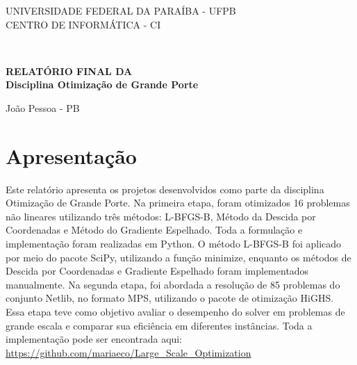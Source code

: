 \documentclass[12pt,a4paper]{article}
\begin{document}
\pagestyle{empty} %

% 
% 

\begin{center}
\Large
UNIVERSIDADE FEDERAL DA PARAÍBA - UFPB \\
CENTRO DE INFORMÁTICA - CI

\end{center}


\vspace{1em}

\begin{center}
\large
{} \\
\end{center}

\vfill


\begin{center}
\LARGE{\textbf{RELATÓRIO FINAL DA\\}
\textbf{Disciplina Otimização de Grande Porte}
}
\end{center}

\vspace{2in}

\begin{center}
\large
João Pessoa - PB
\the\year
\end{center}


\newpage
\section{Apresentação}\label{sec:descr_problema}


Este relatório apresenta os projetos desenvolvidos como parte da disciplina Otimização de Grande Porte. Na primeira etapa, foram otimizados 16 problemas não lineares utilizando três métodos: L-BFGS-B, Método da Descida por Coordenadas e Método do Gradiente Espelhado. Toda a formulação e implementação foram realizadas em Python. O método L-BFGS-B foi aplicado por meio do pacote SciPy, utilizando a função minimize, enquanto os métodos de Descida por Coordenadas e Gradiente Espelhado foram implementados manualmente. Na segunda etapa, foi abordada a resolução de 85 problemas do conjunto Netlib, no formato MPS, utilizando o pacote de otimização HiGHS. Essa etapa teve como objetivo avaliar o desempenho do solver em problemas de grande escala e comparar sua eficiência em diferentes instâncias. Toda a implementação pode ser encontrada aqui: \url{https://github.com/mariaeco/Large_Scale_Optimization}
\end{document}
